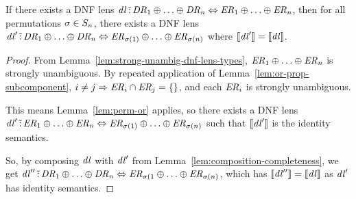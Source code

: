 \documentclass[numbers,10pt,preprint\ifanon ,nocopyrightspace\fi]{sigplanconf}
\begin{document}
\begin{lemma}
  \label{lem:or-dnf-reordering-right}
  If there exists a DNF lens $\mathit{dl} \,\tilde{:}\, \mathit{DR}_1 \oplus \ldots
  \oplus \mathit{DR}_n \Leftrightarrow
  \mathit{ER}_1 \oplus \ldots \oplus \mathit{ER}_n$, then for all permutations
  $\sigma \in S_{n}$, there exists a DNF lens $\mathit{dl}'
  \,\tilde{:}\, \mathit{DR}_1 \oplus \ldots \oplus \mathit{DR}_n
  \Leftrightarrow
  \mathit{ER}_{\sigma(1)} \oplus \ldots \oplus \mathit{ER}_{\sigma(n)}$ where
  $[ \! [\mathit{dl}'] \! ] = [ \! [\mathit{dl}] \! ]$.
\end{lemma}
\begin{proof}
  From Lemma~\ref{lem:strong-unambig-dnf-lens-types},
  $\mathit{ER}_1 \oplus \ldots \oplus \mathit{ER}_n$ is strongly unambiguous.
  By repeated application of Lemma~\ref{lem:or-prop-subcomponent},
  $i \neq j \Rightarrow \mathit{ER}_i \cap \mathit{ER}_j =
  \{\}$, and each $\mathit{ER}_i$ is strongly unambiguous.

  This means Lemma~\ref{lem:perm-or} applies, so there exists a DNF lens
  $\mathit{dl}' \,\tilde{:}\, \mathit{ER}_1 \oplus \ldots \oplus
  \mathit{ER}_n \Leftrightarrow
  \mathit{ER}_{\sigma(1)} \oplus \ldots \oplus \mathit{ER}_{\sigma(n)}$ such
  that $[ \! [\mathit{dl}'] \! ]$ is the identity semantics.

  So, by composing $\mathit{dl}$ with $\mathit{dl}'$ from
  Lemma~\ref{lem:composition-completeness}, we get
  $\mathit{dl}'' \,\tilde{:}\, \mathit{DR}_1 \oplus \ldots \oplus \mathit{DR}_n
  \Leftrightarrow \mathit{ER}_{\sigma(1} \oplus \ldots \oplus
  \mathit{ER}_{\sigma(n)}$, which has $[ \! [\mathit{dl}''] \! ] =
  [ \! [\mathit{dl}] \! ]$ as $\mathit{dl}'$ has identity semantics.
\end{proof}
\end{document}
